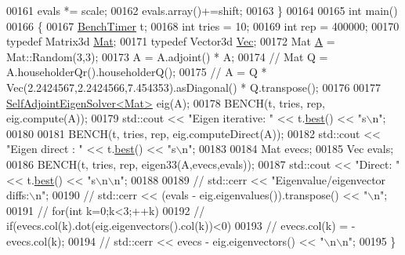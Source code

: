 \begin{DoxyCode}
00161   evals *= scale;
00162   evals.array()+=shift;
00163 \}
00164 
00165 \textcolor{keywordtype}{int} main()
00166 \{
00167   \hyperlink{class_eigen_1_1_bench_timer}{BenchTimer} t;
00168   \textcolor{keywordtype}{int} tries = 10;
00169   \textcolor{keywordtype}{int} rep = 400000;
00170   \textcolor{keyword}{typedef} Matrix3d \hyperlink{group___core___module}{Mat};
00171   \textcolor{keyword}{typedef} Vector3d \hyperlink{group___core___module_class_eigen_1_1_matrix}{Vec};
00172   Mat \hyperlink{group___core___module_class_eigen_1_1_matrix}{A} = Mat::Random(3,3);
00173   A = A.adjoint() * A;
00174 \textcolor{comment}{//   Mat Q = A.householderQr().householderQ();}
00175 \textcolor{comment}{//   A = Q * Vec(2.2424567,2.2424566,7.454353).asDiagonal() * Q.transpose();}
00176 
00177   \hyperlink{group___eigenvalues___module_class_eigen_1_1_self_adjoint_eigen_solver}{SelfAdjointEigenSolver<Mat>} eig(A);
00178   BENCH(t, tries, rep, eig.compute(A));
00179   std::cout << \textcolor{stringliteral}{"Eigen iterative:  "} << t.\hyperlink{class_eigen_1_1_bench_timer_ae8b673b0fa356d3432c7a65c79e8af0e}{best}() << \textcolor{stringliteral}{"s\(\backslash\)n"};
00180   
00181   BENCH(t, tries, rep, eig.computeDirect(A));
00182   std::cout << \textcolor{stringliteral}{"Eigen direct   :  "} << t.\hyperlink{class_eigen_1_1_bench_timer_ae8b673b0fa356d3432c7a65c79e8af0e}{best}() << \textcolor{stringliteral}{"s\(\backslash\)n"};
00183 
00184   Mat evecs;
00185   Vec evals;
00186   BENCH(t, tries, rep, eigen33(A,evecs,evals));
00187   std::cout << \textcolor{stringliteral}{"Direct: "} << t.\hyperlink{class_eigen_1_1_bench_timer_ae8b673b0fa356d3432c7a65c79e8af0e}{best}() << \textcolor{stringliteral}{"s\(\backslash\)n\(\backslash\)n"};
00188 
00189 \textcolor{comment}{//   std::cerr << "Eigenvalue/eigenvector diffs:\(\backslash\)n";}
00190 \textcolor{comment}{//   std::cerr << (evals - eig.eigenvalues()).transpose() << "\(\backslash\)n";}
00191 \textcolor{comment}{//   for(int k=0;k<3;++k)}
00192 \textcolor{comment}{//     if(evecs.col(k).dot(eig.eigenvectors().col(k))<0)}
00193 \textcolor{comment}{//       evecs.col(k) = -evecs.col(k);}
00194 \textcolor{comment}{//   std::cerr << evecs - eig.eigenvectors() << "\(\backslash\)n\(\backslash\)n";}
00195 \}
\end{DoxyCode}
